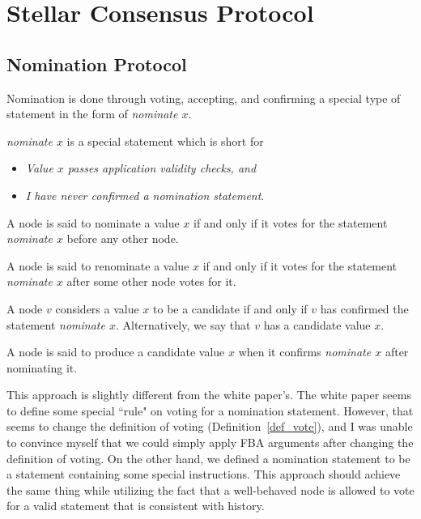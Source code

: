 \section{Stellar Consensus Protocol}
\subsection{Nomination Protocol}

Nomination is done through voting, accepting, and confirming a special type of statement in the form of \textit{nominate $x$}.

\begin{defn}
    \textit{nominate $x$} is a special statement which is short for
    \begin{itemize}
        \item
            \textit{Value $x$ passes application validity checks, and}
        \item
            \textit{I have never confirmed a nomination statement}.
    \end{itemize}
\end{defn}

\begin{defn}[Nominate]
    A node is said to nominate a value $x$ if and only if it votes for the statement \textit{nominate $x$} before any other node.
\end{defn}

\begin{defn}[Renominate]
    A node is said to renominate a value $x$ if and only if it votes for the statement \textit{nominate $x$} after some other node votes for it.
\end{defn}

\begin{defn}[Candidate]
    A node $v$ considers a value $x$ to be a candidate if and only if $v$ has confirmed the statement \textit{nominate $x$}.
    Alternatively, we say that $v$ has a candidate value $x$.
\end{defn}

\begin{defn}[Produce]
    A node is said to produce a candidate value $x$ when it confirms \textit{nominate $x$} after nominating it.
\end{defn}

\begin{rem}
    This approach is slightly different from the white paper's.
    The white paper seems to define some special ``rule" on voting for a nomination statement.
    However, that seems to change the definition of voting (Definition~\ref{def_vote}), and I was unable to convince myself that we could simply apply FBA arguments after changing the definition of voting.
    On the other hand, we defined a nomination statement to be a statement containing some special instructions.
    This approach should achieve the same thing while utilizing the fact that a well-behaved node is allowed to vote for a valid statement that is consistent with history.
\end{rem}

